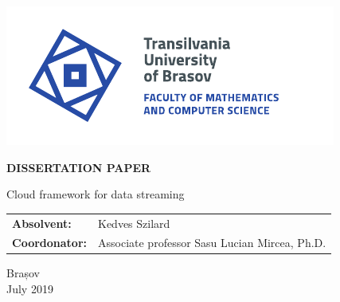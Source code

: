\begin{titlepage}
	
	\vspace*{-3cm}
	\hspace{-2cm}
	\includegraphics[width=0.8\linewidth]{./images/Logo-UT-MI-SPOT-EN}
	
	\begin{center}
		\Huge
		
		\vspace{2cm}
		
		\textbf{DISSERTATION PAPER}
		
		\vspace{1cm}
		
		\LARGE
		Cloud framework for data streaming
		
		\vfill
		
		\Large
		\begin{tabular}{ll}
			\textbf{Absolvent:}&Kedves Szilard\\
			\textbf{Coordonator:}&Associate professor Sasu Lucian Mircea, Ph.D.
		\end{tabular}
		
		\vfill
		
		\Large
		Brașov\\
		July 2019
		
	\end{center}
\end{titlepage}